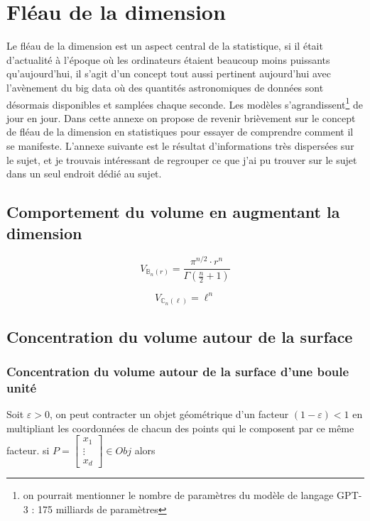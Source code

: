 \chapter{Fléau de la dimension}

\minitoc%

Le fléau de la dimension est un aspect central de la statistique, si il était d'actualité à l'époque où les ordinateurs étaient beaucoup moins puissants qu'aujourd'hui, il s'agit d'un concept tout aussi pertinent aujourd'hui avec l'avènement du \og big data \fg où des quantités astronomiques de données sont désormais disponibles et samplées chaque seconde. Les modèles s'agrandissent\footnote{on pourrait mentionner le nombre de paramètres du modèle de langage GPT-3 : 175 milliards de paramètres\cite{brown2020language}} de jour en jour. 
Dans cette annexe on propose de revenir brièvement sur le concept de fléau de la dimension en statistiques pour essayer de comprendre comment il se manifeste. L'annexe suivante est le résultat d'informations très dispersées sur le sujet, et je trouvais intéressant de regrouper ce que j'ai pu trouver sur le sujet dans un seul endroit dédié au sujet.

\section{Comportement du volume en augmentant la dimension}

\begin{equation}
    V_{\mathds B_n(r)} = \frac{\pi^{n/2} \cdot r^n}{\Gamma(\frac n 2 + 1)}
\end{equation}


\begin{equation}
    V_{\mathds C_n(\ell)} = \ell^n
\end{equation}


\section{Concentration du volume autour de la surface}

\subsection{Concentration du volume autour de la surface d'une boule unité}

Soit $\varepsilon > 0$, on peut contracter un objet géométrique d'un facteur $(1-\varepsilon) < 1$ en multipliant les coordonnées de chacun des points qui le composent par ce même facteur. si $P = \begin{bmatrix} x_1 \\ \vdots \\ x_d \end{bmatrix} \in Obj$ alors 


